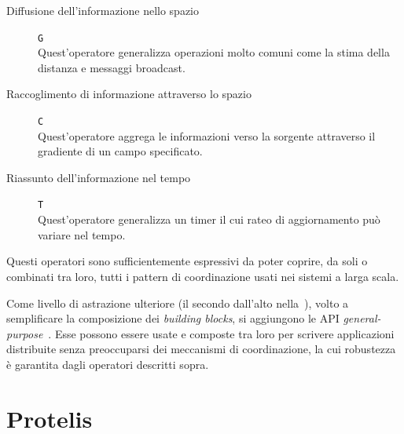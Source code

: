 

\begin{description}
  \item[Diffusione dell'informazione nello spazio] \texttt{G} \\ %
    Quest'operatore generalizza operazioni molto comuni come la stima della distanza e messaggi broadcast.
  \item[Raccoglimento di informazione attraverso lo spazio] \texttt{C} \\ %
    Quest'operatore aggrega le informazioni verso la sorgente attraverso il gradiente di un campo specificato.
  \item[Riassunto dell'informazione nel tempo] \texttt{T} \\ %
    Quest'operatore generalizza un timer il cui rateo di aggiornamento può variare nel tempo.
\end{description}

Questi operatori sono sufficientemente espressivi da poter coprire, da soli o combinati tra loro, tutti i pattern di coordinazione usati nei sistemi a larga scala.

Come livello di astrazione ulteriore (il secondo dall'alto nella~), volto a semplificare la composizione dei \emph{building blocks}, si aggiungono le API \emph{general-purpose}~\cite{amslaurea13090}.
Esse possono essere usate e composte tra loro per scrivere applicazioni distribuite senza preoccuparsi dei meccanismi di coordinazione, la cui robustezza è garantita dagli operatori descritti sopra.

\section{Protelis}\label{sec:protelis}

